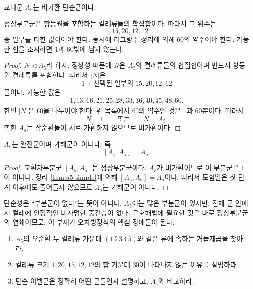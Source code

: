 \begin{theorem}[$A_5$의 단순성]
\label{thm:a5-simple}
교대군 $A_5$는 비가환 단순군이다.
\end{theorem}

\begin{proofidea}
정상부분군은 항등원을 포함하는 켤레류들의 합집합이다. 따라서 그 위수는
\[
  1,15,20,12,12
\]
중 일부를 더한 값이어야 한다. 동시에 라그랑주 정리에 의해 $60$의 약수여야 한다. 가능한 합을 조사하면 $1$과 $60$밖에 남지 않는다.
\end{proofidea}

\begin{proof}
$N\triangleleft A_5$라 하자. 정상성 때문에 $N$은 $A_5$의 켤레류들의 합집합이며 반드시 항등원 켤레류를 포함한다. 따라서 $|N|$은
\[
  1+\text{선택된 일부의 }15,20,12,12
\]
꼴이다. 가능한 값은
\[
\begin{gathered}
1,13,16,21,25,28,33,36,40,45,48,60.
\end{gathered}
\]
한편 $|N|$은 $60$을 나누어야 한다. 위 목록에서 $60$의 약수인 것은 $1$과 $60$뿐이다. 따라서
\[
  N=1\qquad\text{또는}\qquad N=A_5.
\]
또한 $A_5$는 삼순환들이 서로 가환하지 않으므로 비가환이다.
\end{proof}

\begin{corollary}
\label{cor:a5-perfect-nonsolvable}
$A_5$는 완전군이며 가해군이 아니다. 즉
\[
  [A_5,A_5]=A_5.
\]
\end{corollary}

\begin{proof}
교환자부분군 $[A_5,A_5]$는 정상부분군이다. $A_5$가 비가환이므로 이 부분군은 $1$이 아니다. 정리 \ref{thm:a5-simple}에 의해 $[A_5,A_5]=A_5$이다. 따라서 도함열은 첫 단계 이후에도 줄어들지 않으므로 $A_5$는 가해군이 아니다.
\end{proof}

\begin{keyidea}
단순성은 ``부분군이 없다''는 뜻이 아니다. $A_5$에는 많은 부분군이 있지만, 전체 군 안에서 켤레에 안정적인 비자명한 중간층이 없다. 근호해법에 필요한 것은 바로 정상부분군의 연쇄이므로, 이 부재가 오차방정식의 핵심 장애물이 된다.
\end{keyidea}

\begin{checkpoint}
\begin{enumerate}[label=(\alph*)]
  \item $A_5$의 오순환 두 켤레류 가운데 $(1\,2\,3\,4\,5)$와 같은 류에 속하는 거듭제곱을 찾아라.
  \item 켤레류 크기 $1,20,15,12,12$의 합 가운데 $30$이 나타나지 않는 이유를 설명하라.
  \item 단순 아벨군은 정확히 어떤 군들인지 설명하고, $A_5$와 비교하라.
\end{enumerate}
\end{checkpoint}
